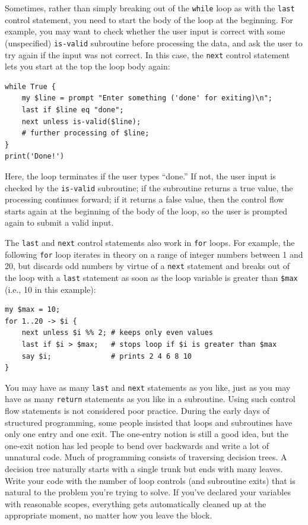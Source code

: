Sometimes, rather than simply breaking out of the {\tt while}  loop 
as with the {\tt last} control statement, you need to start the 
body of the loop at the beginning. For example, you may want 
to check whether the user input is correct with some 
(unspecified) {\tt is-valid} subroutine before processing 
the data, and ask the user to try again if the input was not 
correct. In this case, the {\tt next} control statement lets 
you start at the top the loop body again:

\begin{verbatim}
while True {
    my $line = prompt "Enter something ('done' for exiting)\n";
    last if $line eq "done";
    next unless is-valid($line);
    # further processing of $line;
}
print('Done!')
\end{verbatim}
%
Here, the loop terminates if the user types ``done.'' If not, the user input is checked by the {\tt is-valid} subroutine; if the subroutine returns a true value, the processing continues forward; if it returns a false value, then the control flow starts again at the beginning of the body of the loop, so the user is prompted again to submit a valid input.

The {\tt last} and {\tt next} control statements also work in 
{\tt for} loops. For example, the following {\tt for} loop 
iterates in theory on a range of integer numbers between 1 and 20, 
but discards odd numbers by virtue of a {\tt next} statement 
and breaks out of the loop with a {\tt last} statement as 
soon as the loop variable is greater than {\tt \$max} (i.e., 10 in this  example):

\begin{verbatim}
my $max = 10;
for 1..20 -> $i {
    next unless $i %% 2; # keeps only even values
    last if $i > $max;   # stops loop if $i is greater than $max
    say $i;              # prints 2 4 6 8 10
}
\end{verbatim}

You may have as many {\tt last} and {\tt next} statements as you 
like, just as you may have as many {\tt return} statements as 
you like in a subroutine. Using such control flow statements 
is not considered poor 
practice. During the early days of structured programming, 
some people insisted that loops and subroutines have only one 
entry and one exit. The one-entry notion is still a good idea, 
but the one-exit notion has led people to bend over backwards 
and write a lot of unnatural code. Much of programming consists of traversing 
decision trees. A decision tree naturally starts with a single 
trunk but ends with many leaves. Write your code with the number 
of loop controls (and subroutine exits) that is natural to the 
problem you're trying to solve. If you've declared your variables 
with reasonable scopes, everything gets automatically cleaned up 
at the appropriate moment, no matter how you leave the block.


